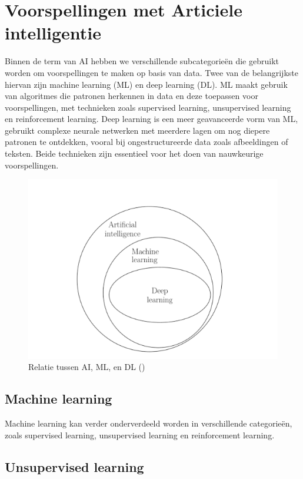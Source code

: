 \newpage	

\section{Voorspellingen met Articiele intelligentie}  

Binnen de term van AI hebben we verschillende subcategorieën die gebruikt worden om voorspellingen te maken op basis van data. Twee van de belangrijkste hiervan zijn machine learning (ML) en deep learning (DL). ML maakt gebruik van algoritmes die patronen herkennen in data en deze toepassen voor voorspellingen, met technieken zoals supervised learning, unsupervised learning en reinforcement learning. Deep learning is een meer geavanceerde vorm van ML, gebruikt complexe neurale netwerken met meerdere lagen om nog diepere patronen te ontdekken, vooral bij ongestructureerde data zoals afbeeldingen of teksten. Beide technieken zijn essentieel voor het doen van nauwkeurige voorspellingen.

\begin{figure}[H]
    \centering
    \includegraphics[width=0.7\linewidth]{images/RelatieAI_ML_DL}
    \caption{Relatie tussen AI, ML, en DL  (\cite{Kelleher2019})}
    \label{fig:relatieaimldl}
\end{figure}

\subsection{Machine learning}

Machine learning kan verder onderverdeeld worden in verschillende categorieën, zoals supervised learning, unsupervised learning en reinforcement learning.

\subsection*{Unsupervised learning}

